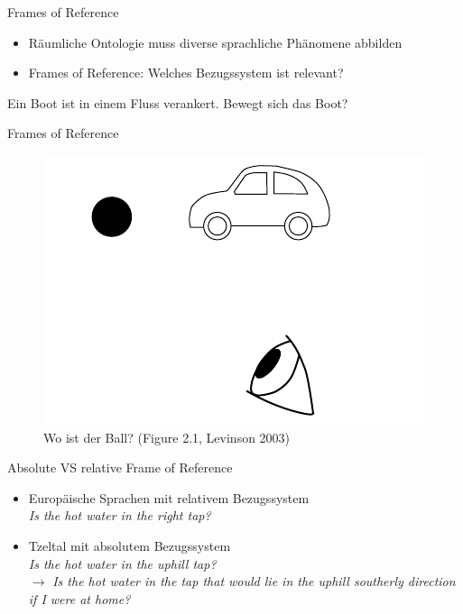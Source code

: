 \documentclass[12pt,a4paper]{beamer}
\begin{document}
\begin{frame}{Frames of Reference}
\begin{itemize}
\item Räumliche Ontologie muss diverse sprachliche Phänomene abbilden
\item Frames of Reference: Welches Bezugssystem ist relevant?
\end{itemize}

Ein Boot ist in einem Fluss verankert. Bewegt sich das Boot?

\end{frame}

\begin{frame}{Frames of Reference}
\begin{figure}
\includegraphics[scale=0.45]{img/levinson_fig_2-1.png}
\caption{Wo ist der Ball? (Figure 2.1, Levinson 2003)}
\end{figure}
\end{frame}


\begin{frame}{Absolute VS relative Frame of Reference}
\begin{itemize}
\item Europäische Sprachen mit relativem Bezugssystem \\
\textit{Is the hot water in the right tap?}
\item Tzeltal mit absolutem Bezugssystem \\
\textit{Is the hot water in the uphill tap?} \\
$\to$ \textit{Is the hot water in the tap that would lie in the uphill southerly direction if I were at home?}
\end{itemize}
\end{frame}
\end{document}
